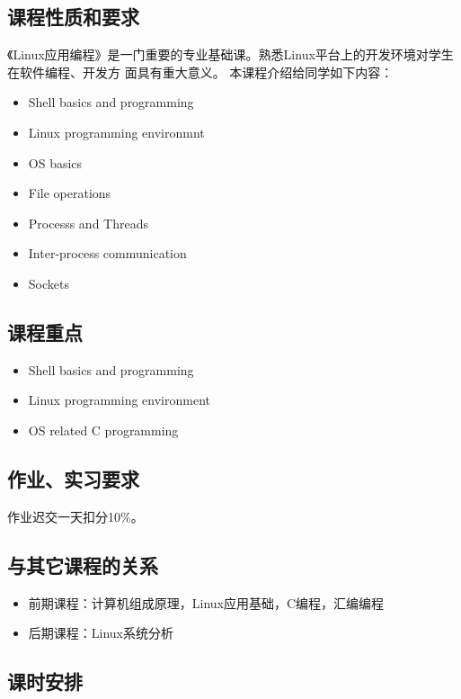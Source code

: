 \documentclass{wx672ctexart}
\begin{document}
\subsection{课程性质和要求}
\label{sec-2-1}

《Linux应用编程》是一门重要的专业基础课。熟悉Linux平台上的开发环境对学生在软件编程、开发方
面具有重大意义。 本课程介绍给同学如下内容：
\begin{itemize}
\item Shell basics and programming
\item Linux programming environmnt
\item OS basics
\item File operations
\item Processs and Threads
\item Inter-process communication
\item Sockets
\end{itemize}

\subsection{课程重点}
\label{sec-2-2}

\begin{itemize}
\item Shell basics and programming
\item Linux programming environment
\item OS related C programming
\end{itemize}

\subsection{作业、实习要求}
\label{sec-2-3}
作业迟交一天扣分10\%。

\subsection{与其它课程的关系}
\label{sec-2-4}

\begin{itemize}
\item 前期课程：计算机组成原理，Linux应用基础，C编程，汇编编程
\item 后期课程：Linux系统分析
\end{itemize}

\subsection{课时安排}
\label{sec-2-5}
\end{document}
